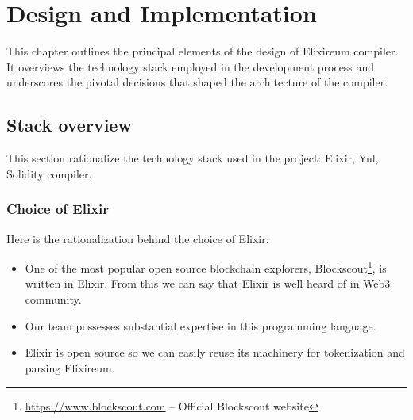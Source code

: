 \chapter{Design and Implementation}
\label{chap:impl}

This chapter outlines the principal elements of the design of Elixireum compiler. It overviews the technology stack employed in the development process and underscores the pivotal decisions that shaped the architecture of the compiler.








\section{Stack overview}
\label{sec:architecture}
This section rationalize the technology stack used in the project: Elixir, Yul, Solidity compiler.
\subsection{Choice of Elixir}
Here is the rationalization behind the choice of Elixir:
\begin{itemize}
    \item One of the most popular open source blockchain explorers, Blockscout\footnote{\href{https://www.blockscout.com/}{https://www.blockscout.com} -- Official Blockscout website}, is written in Elixir. From this we can say that Elixir is well heard of in Web3 community.
    \item Our team possesses substantial expertise in this programming language.
    \item Elixir is open source so we can easily reuse its machinery for tokenization and parsing Elixireum.
\end{itemize}

